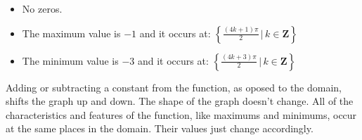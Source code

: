 \documentclass{ximera}
\begin{document}
\begin{example}
\begin{image}
\end{image}



\begin{itemize}
\item No zeros.
\item The maximum value is $-1$ and it occurs at:  $\left\{     \frac{(4k+1)\pi}{2} \, | \, k \in \textbf{Z}     \right\}$
\item The minimum value is $-3$ and it occurs at:  $\left\{    \frac{(4k+3)\pi}{2} \, | \, k \in \textbf{Z}     \right\}$
\end{itemize}














\end{example}






Adding or subtracting a constant from the function, as oposed to the domain, shifts the graph up and down.  The shape of the graph doesn't change.  All of the characteristics and features of the function, like maximums and minimums, occur at the same places in the domain.  Their values just change accordingly.
\end{document}
